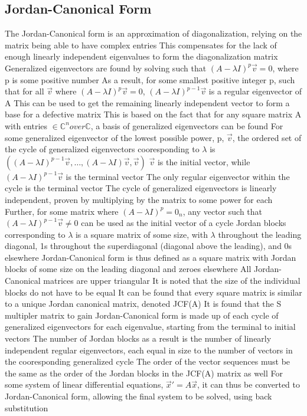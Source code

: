 \documentclass[11 pt, twoside]{article}
\newenvironment{outline*}
{
	\begin{outline}[enumerate]
	}
	{\end{outline}
}
\begin{document}
\subsection{Jordan-Canonical Form}
\begin{outline*}
\1 The Jordan-Canonical form is an approximation of diagonalization, relying on the matrix being able to have complex entries
\2 This compensates for the lack of enough linearly independent eigenvalues to form the diagonalization matrix
\1 Generalized eigenvectors are found by solving such that $(A - \lambda I)^p \vec{v} = 0$, where p is some positive number
\2 As a result, for some smallest positive integer p, such that for all $\vec{v}$ where $(A - \lambda I)^p \vec{v} = 0$, $(A - \lambda I)^{p-1}\vec{v}$ is a regular eigenvector of A
\2 This can be used to get the remaining linearly independent vector to form a base for a defective matrix
\3 This is based on the fact that for any square matrix A with entries $\in \mathbb{C}^n over \mathbb{C}$, a basis of generalized eigenvectors can be found
\2 For some generalized eigenvector of the lowest possible power, p, $\vec{v}$, the ordered set of the cycle of generalized eigenvectors cooresponding to $\lambda$ is $((A - \lambda I)^{p-1}\vec{v}, \dots, (A - \lambda I)\vec{v}, \vec{v})$
\3 $\vec{v}$ is the initial vector, while $(A - \lambda I)^{p-1}\vec{v}$ is the terminal vector
\3 The only regular eigenvector within the cycle is the terminal vector
\3 The cycle of generalized eigenvectors is linearly independent, proven by multiplying by the matrix to some power for each
\3 Further, for some matrix where $(A - \lambda I)^p = 0_n$, any vector such that $(A - \lambda I)^{p-1}\vec{v} \neq 0$ can be used as the initial vector of a cycle
\1 Jordan blocks corresponding to $\lambda$ is a square matrix of some size, with $\lambda$ throughout the leading diagonal, 1s throughout the superdiagonal (diagonal above the leading), and 0s elsewhere
\2 Jordan-Canonical form is thus defined as a square matrix with Jordan blocks of some size on the leading diagonal and zeroes elsewhere
\3 All Jordan-Canonical matrices are upper triangular
\3 It is noted that the size of the individual blocks do not have to be equal
\2 It can be found that every square matrix is similar to a unique Jordan canonical matrix, denoted JCF(A)
\2 It is found that the S multipler matrix to gain Jordan-Canonical form is made up of each cycle of generalized eigenvectors for each eigenvalue, starting from the terminal to initial vectors
\3 The number of Jordan blocks as a result is the number of linearly independent regular eigenvectors, each equal in size to the number of vectors in the cooresponding generalized cycle
\3 The order of the vector sequences must be the same as the order of the Jordan blocks in the JCF(A) matrix as well
\1 For some system of linear differential equations, $\vec{x}' = A\vec{x}$, it can thus be converted to Jordan-Canonical form, allowing the final system to be solved, using back substitution
\end{outline*}
\end{document}
